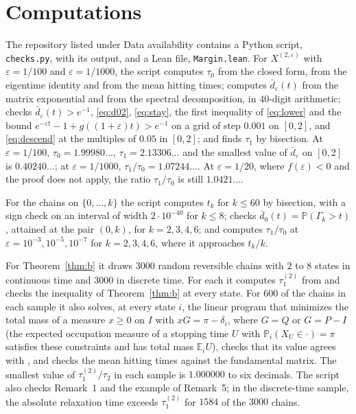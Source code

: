\documentclass[11pt]{amsart}
\numberwithin{equation}{section}
\newcommand{\Pp}{\mathbb P}
\newcommand{\E}{\mathbb E}
\newcommand{\dbar}{\bar d}
\begin{document}
\section{Computations}\label{sec:checks}

The repository listed under Data availability contains a Python script, \texttt{checks.py}, with its output, and a Lean file, \texttt{Margin.lean}. For $X^{(2,\varepsilon)}$ with $\varepsilon=1/100$ and $\varepsilon=1/1000$, the script computes $\tau_0$ from the closed form, from the eigentime identity and from the mean hitting times; computes $\dbar_\varepsilon(t)$ from the matrix exponential and from the spectral decomposition, in $40$-digit arithmetic; checks $\dbar_\varepsilon(t)>e^{-1}$, \eqref{eq:d02}, \eqref{eq:stay}, the first inequality of \eqref{eq:lower} and the bound $e^{-\varepsilon t}-1+g((1+\varepsilon)t)>e^{-1}$ on a grid of step $0.001$ on $[0,2]$, and \eqref{eq:descend} at the multiples of $0.05$ in $[0,2]$; and finds $\tau_1$ by bisection. At $\varepsilon=1/100$, $\tau_0=1.99980\ldots$, $\tau_1=2.13306\ldots$ and the smallest value of $\dbar_\varepsilon$ on $[0,2]$ is $0.40240\ldots$; at $\varepsilon=1/1000$, $\tau_1/\tau_0=1.07244\ldots$. At $\varepsilon=1/20$, where $f(\varepsilon)<0$ and the proof does not apply, the ratio $\tau_1/\tau_0$ is still $1.0421\ldots$.

For the chains on $\{0,\dots,k\}$ the script computes $t_k$ for $k\le60$ by bisection, with a sign check on an interval of width $2\cdot10^{-40}$ for $k\le8$; checks $\dbar_0(t)=\Pp(\Gamma_k>t)$, attained at the pair $(0,k)$, for $k=2,3,4,6$; and computes $\tau_1/\tau_0$ at $\varepsilon=10^{-3},10^{-5},10^{-7}$ for $k=2,3,4,6$, where it approaches $t_k/k$.

For Theorem~\ref{thm:b} it draws $3000$ random reversible chains with $2$ to $8$ states in continuous time and $3000$ in discrete time. For each it computes $\tau_1^{(2)}$ from \cite[(4.47)]{AF} and checks the inequality of Theorem~\ref{thm:b} at every state. For $600$ of the chains in each sample it also solves, at every state $i$, the linear program that minimizes the total mass of a measure $x\ge0$ on $I$ with $xG=\pi-\delta_i$, where $G=Q$ or $G=P-I$ (the expected occupation measure of a stopping time $U$ with $\Pp_i(X_U\in\cdot)=\pi$ satisfies these constraints and has total mass $\E_iU$), checks that its value agrees with \cite[(4.47)]{AF}, and checks the mean hitting times against the fundamental matrix. The smallest value of $\tau_1^{(2)}/\tau_2$ in each sample is $1.000000$ to six decimals. The script also checks Remark~1 and the example of Remark~5; in the discrete-time sample, the absolute relaxation time exceeds $\tau_1^{(2)}$ for $1584$ of the $3000$ chains.
\end{document}
